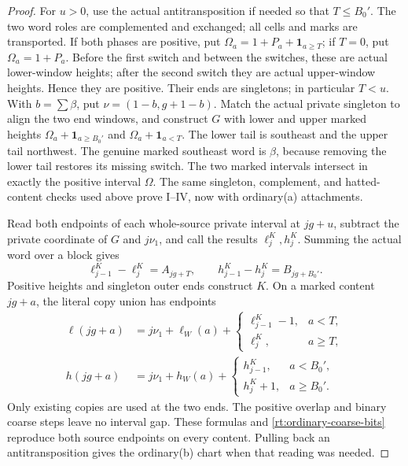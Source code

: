 \documentclass[11pt,a4paper]{amsart}
\numberwithin{equation}{section}
\theoremstyle{plain}
\theoremstyle{definition}
\newcommand{\one}{\mathbf1}
\begin{document}
\begin{proof}
For \(u>0\), use the actual antitransposition if needed so that \(T\le B_0'\).  The two word roles are complemented and exchanged; all cells and marks are transported.  If both phases are positive, put
\(\Omega_a=1+P_a+\one_{a\ge T}\); if \(T=0\), put \(\Omega_a=1+P_a\).
Before the first switch and between the switches, these are actual lower-window heights; after the second switch they are actual upper-window heights.  Hence they are positive.  Their ends are singletons; in particular \(T<u\).  With \(b=\sum\beta\), put \(\nu=(1-b,g+1-b)\).  Match the actual private singleton to align the two end windows, and construct \(G\) with lower and upper marked heights
\(\Omega_a+\one_{a\ge B_0'}\) and \(\Omega_a+\one_{a<T}\).
The lower tail is southeast and the upper tail northwest.  The genuine marked southeast word is \(\beta\), because removing the lower tail restores its missing switch.  The two marked intervals intersect in exactly the positive interval \(\Omega\).  The same singleton, complement, and hatted-content checks used above prove I--IV, now with ordinary(a) attachments.

Read both endpoints of each whole-source private interval at \(jg+u\), subtract the private coordinate of \(G\) and \(j\nu_1\), and call the results \(\ell_j^K,h_j^K\).  Summing the actual word over a block gives
\begin{equation}\label{rt:ordinary-coarse-bits}
 \ell_{j-1}^K-\ell_j^K=A_{jg+T},\qquad
 h_{j-1}^K-h_j^K=B_{jg+B_0'}.
\end{equation}
Positive heights and singleton outer ends construct \(K\).  On a marked content \(jg+a\), the literal copy union has endpoints
\begin{align*}
 \ell(jg+a)&=j\nu_1+\ell_W(a)+
   \begin{cases}\ell_{j-1}^K-1,&a<T,\\\ell_j^K,&a\ge T,\end{cases}\\
 h(jg+a)&=j\nu_1+h_W(a)+
   \begin{cases}h_{j-1}^K,&a<B_0',\\h_j^K+1,&a\ge B_0'.\end{cases}
\end{align*}
Only existing copies are used at the two ends.  The positive overlap and binary coarse steps leave no interval gap.  These formulas and \eqref{rt:ordinary-coarse-bits} reproduce both source endpoints on every content.  Pulling back an antitransposition gives the ordinary(b) chart when that reading was needed.


\end{proof}
\end{document}
